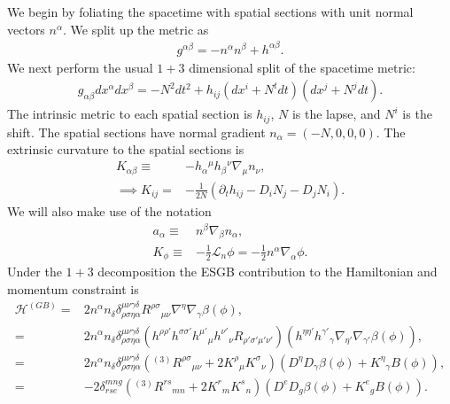 \documentclass[%
notitlepage,
report,
nofootinbib,
 amsmath,amssymb,
 aps,
]{revtex4-1}
\begin{document}
We begin by foliating the spacetime with spatial sections with unit
normal vectors $n^{\alpha}$. We split up the metric as
\begin{align}
   g^{\alpha\beta}
   =
   -
   n^{\alpha}n^{\beta}
   +
   h^{\alpha\beta}
   .
\end{align}
We next perform the usual $1+3$ dimensional split of the spacetime metric:
\begin{align}
   g_{\alpha\beta}dx^{\alpha}dx^{\beta}
   =
   -
   N^2dt^2
   +
   h_{ij}
   \left(dx^i+N^tdt\right)\left(dx^j+N^jdt\right)
   .
\end{align}
The intrinsic metric to each spatial section is $h_{ij}$,
$N$ is the lapse, and $N^i$ is the shift. The spatial
sections have normal gradient $n_{\alpha}=(-N,0,0,0)$.
The extrinsic curvature to the spatial sections is
\begin{subequations}
\begin{align}
   K_{\alpha\beta}
   \equiv&
   -
   h_{\alpha}{}^{\mu}h_{\beta}{}^{\nu}\nabla_{\mu}n_{\nu}
   ,\\
   \implies
   K_{ij}
   =&
   -
   \frac{1}{2N}
   \left(
      \partial_th_{ij}
      -
      D_iN_j
      -
      D_jN_i
   \right)
   .
\end{align}
\end{subequations}
We will also make use of the notation
\begin{subequations}
\begin{align}
   a_{\alpha}
   \equiv&
   n^{\beta}\nabla_{\beta}n_{\alpha}
   ,\\
   K_{\phi}
   \equiv&
   -\frac{1}{2}\mathcal{L}_n\phi
   =
   -\frac{1}{2}n^{\alpha}\nabla_{\alpha}\phi
   .
\end{align}
\end{subequations}
Under the $1+3$ decomposition the ESGB contribution
to the Hamiltonian and momentum constraint is
\begin{align}
\label{eq:hamiltonian_constraint_3p1}
   \mathcal{H}^{(GB)}
   =&
   2n^{\alpha}n_{\delta}
   \delta^{\mu\nu\gamma\delta}_{\rho\sigma\eta\alpha}
   R^{\rho\sigma}{}_{\mu\nu}
   \nabla^{\eta}\nabla_{\gamma}\beta\left(\phi\right)
   ,\nonumber\\
   =&
   2n^{\alpha}n_{\delta}
   \delta^{\mu\nu\gamma\delta}_{\rho\sigma\eta\alpha}
   \left(
      h^{\rho\rho'}h^{\sigma\sigma'}
      h^{\mu'}{}_{\mu}h^{\nu'}{}_{\nu}
      R_{\rho'\sigma'\mu'\nu'}
   \right)
   \left(
      h^{\eta\eta'}h^{\gamma'}{}_{\gamma}
      \nabla_{\eta'}\nabla_{\gamma'}\beta\left(\phi\right)
   \right)
   ,\nonumber\\
   =&
   2n^{\alpha}n_{\delta}
   \delta^{\mu\nu\gamma\delta}_{\rho\sigma\eta\alpha}
   \left(
      {}^{(3)}R^{\rho\sigma}{}_{\mu\nu}
      +
      2K^{\rho}{}_{\mu}K^{\sigma}{}_{\nu}
   \right)
   \left(
      D^{\eta}D_{\gamma}\beta\left(\phi\right)
      +
      K^{\eta}{}_{\gamma}B\left(\phi\right)
   \right)
   ,\nonumber\\
   =&
   -2
   \delta^{mng}_{rse}
   \left(
      {}^{(3)}R^{rs}{}_{mn}
      +
      2K^{r}{}_{m}K^{s}{}_{n}
   \right)
   \left(
      D^{e}D_{g}\beta\left(\phi\right)
      +
      K^{e}{}_{g}B\left(\phi\right)
   \right)
   .
\end{align}
\end{document}
